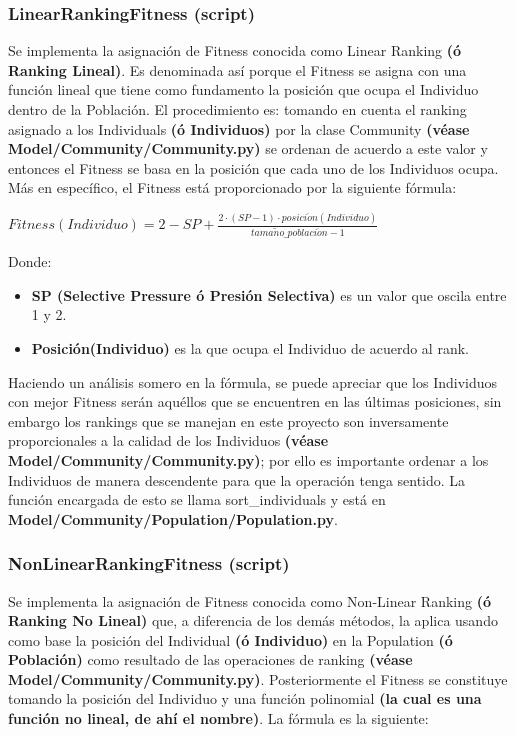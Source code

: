 \documentclass[class=report, crop=false]{standalone}
\begin{document}
\subsubsection{LinearRankingFitness (script)}
\label{sec:a_2_3_1}
Se implementa la asignación de Fitness conocida como 
Linear Ranking \textbf{(ó Ranking Lineal)}. Es denominada 
así porque el Fitness se asigna con una función lineal que 
tiene como fundamento la posición que ocupa el Individuo dentro 
de la Población.\break
El procedimiento es: tomando en cuenta el ranking asignado a 
los Individuals \textbf{(ó Individuos)} por la clase Community 
\textbf{(véase Model/Community/Community.py)} se ordenan de 
acuerdo a este valor y entonces el Fitness se basa en la posición 
que cada uno de los Individuos ocupa. Más en específico, el Fitness 
está proporcionado por la siguiente fórmula:

\begin{center}\(Fitness(Individuo) = 2 - SP + \frac{2 \cdot (SP - 1) \cdot posici\acute{o}n(Individuo)}{tama\tilde{n}o\_poblaci\acute{o}n - 1}\)
\end{center}

Donde:

\begin{itemize}
\item \textbf{SP (Selective Pressure ó Presión Selectiva)} es un valor que oscila entre 1 y 2.
\item \textbf{Posición(Individuo)} es la que ocupa el Individuo de acuerdo al rank.
\end{itemize}

Haciendo un análisis somero en la fórmula, se puede apreciar que los
Individuos con mejor Fitness serán aquéllos que se encuentren en las 
últimas posiciones, sin embargo los rankings que se manejan en este 
proyecto son inversamente proporcionales a la calidad de los Individuos 
\textbf{(véase Model/Community/Community.py)}; por ello es importante 
ordenar a los Individuos de manera descendente para que la operación 
tenga sentido. La función encargada de esto se llama sort\_individuals 
y está en \textbf{Model/Community/}\break\textbf{Population/Population.py}.

\subsubsection{NonLinearRankingFitness (script)}
\label{sec:a_2_3_2}
Se implementa la asignación de Fitness conocida como Non-Linear Ranking
\textbf{(ó Ranking No Lineal)} que, a diferencia de los demás métodos, 
la aplica usando como base la posición del Individual \textbf{(ó Individuo)} 
en la Population \textbf{(ó Población)} como resultado de las operaciones 
de ranking \textbf{(véase Model/Community/Community.py)}.\break
Posteriormente el Fitness se constituye tomando la posición del 
Individuo y una función polinomial \textbf{(la cual es una función no lineal, de ahí el nombre)}.
La fórmula es la siguiente:
\end{document}
